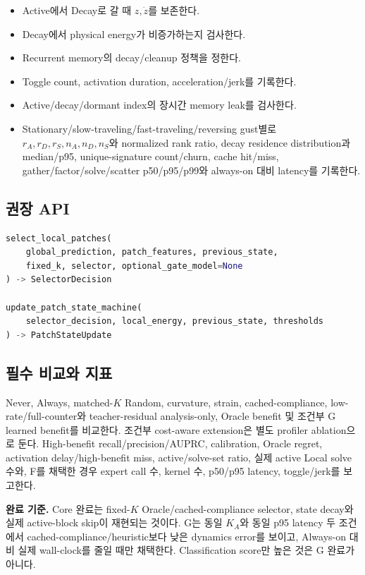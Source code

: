 \documentclass[10pt,a4paper]{article}
\newcommand{\todo}{\textcolor{TodoGray}{\(\square\)}}
\begin{document}
\begin{itemize}
  \item[\todo] Active에서 Decay로 갈 때 \(z,\dot z\)를 보존한다.
  \item[\todo] Decay에서 physical energy가 비증가하는지 검사한다.
  \item[\todo] Recurrent memory의 decay/cleanup 정책을 정한다.
  \item[\todo] Toggle count, activation duration, acceleration/jerk를 기록한다.
  \item[\todo] Active/decay/dormant index의 장시간 memory leak를 검사한다.
  \item[\todo] Stationary/slow-traveling/fast-traveling/reversing gust별로
  \(r_A,r_D,r_S,n_A,n_D,n_S\)와 normalized rank ratio,
  decay residence distribution과 median/p95,
  unique-signature count/churn, cache hit/miss,
  gather/factor/solve/scatter p50/p95/p99와 always-on 대비 latency를 기록한다.
\end{itemize}

\subsection*{권장 API}

\begin{lstlisting}[language=Python]
select_local_patches(
    global_prediction, patch_features, previous_state,
    fixed_k, selector, optional_gate_model=None
) -> SelectorDecision

update_patch_state_machine(
    selector_decision, local_energy, previous_state, thresholds
) -> PatchStateUpdate
\end{lstlisting}

\subsection*{필수 비교와 지표}

Never, Always, matched-\(K\) Random, curvature, strain, cached-compliance,
low-rate/full-counter와 teacher-residual analysis-only, Oracle benefit 및 조건부 G learned benefit를 비교한다.
조건부 cost-aware extension은 별도 profiler ablation으로 둔다.
High-benefit recall/precision/AUPRC, calibration, Oracle regret, activation delay/high-benefit miss,
active/solve-set ratio,
실제 active Local solve 수와, F를 채택한 경우 expert call 수, kernel 수, p50/p95 latency, toggle/jerk를 보고한다.

\textbf{완료 기준.}
Core 완료는 fixed-\(K\) Oracle/cached-compliance selector, state decay와 실제 active-block skip이 재현되는 것이다.
G는 동일 \(K_A\)와 동일 p95 latency 두 조건에서 cached-compliance/heuristic보다 낮은 dynamics error를 보이고,
Always-on 대비 실제 wall-clock를 줄일 때만 채택한다. Classification score만 높은 것은 G 완료가 아니다.
\end{document}
